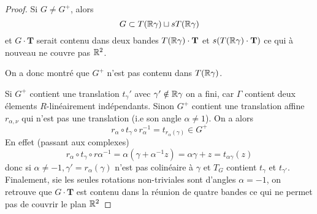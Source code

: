 \begin{proof}
	Si $G \neq G^+$, alors
	\begin{equation*}
		G \subset T(\mathbb{R}\gamma) \sqcup sT(\mathbb{R}\gamma)
	\end{equation*}
	et $G \cdot \mathbf{T}$ serait contenu dans deux bandes
	$T(\mathbb{R}\gamma) \cdot \mathbf{T}$ et $s(T(\mathbb{R}\gamma) \cdot \mathbf{T})$ ce qui à
	nouveau ne couvre pas $\mathbb{R}^2$.

	On a donc montré que $G^+$ n'est pas contenu dans $T(\mathbb{R} \gamma)$.

	Si $G^+$ contient une translation $t_\gamma'$ avec $\gamma' \notin \mathbb{R}\gamma$
	on a fini, car $\Gamma$ contient deux élements $R$-linéairement
	indépendants. Sinon $G^+$ contient une translation affine $r_{\alpha, \nu}$
	qui n'est pas une translation (i.e son angle $\alpha \neq 1$). On a alors
	\begin{equation*}
		r_\alpha \circ t_\gamma \circ r_\alpha^{-1} = t_{r_\alpha(\gamma)} \in G^+
	\end{equation*}
	En effet (passant aux complexes)
	\begin{equation*}
		r_\alpha \circ t_\gamma \circ r\alpha^{-1} = \alpha(\gamma + \alpha^{-1}z)
		= \alpha\gamma + z = t_{\alpha\gamma}(z)
	\end{equation*}
	donc si $\alpha \neq -1, \gamma' = r_\alpha(\gamma)$ n'est pas colinéaire à
	$\gamma$ et $T_G$ contient $t_\gamma$ et $t_{\gamma'}$.
	Finalement, sie les seules rotations non-triviales sont d'angles $\alpha =
	-1$, on retrouve que $G\cdot\mathbf{T}$ est contenu dans la réunion de
	quatre bandes ce qui ne permet pas de couvrir le plan $\mathbb{R}^2$
\end{proof}
